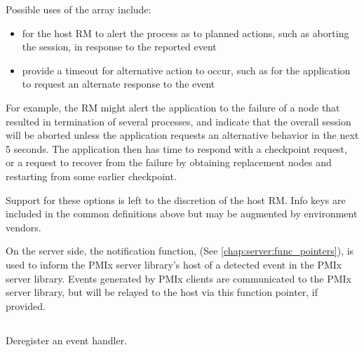 \adviceuserstart
Possible uses of the  array include:

\begin{itemize}
%
\item for the host \ac{RM} to alert the process as to planned actions, such as aborting the session, in response to the reported event
%
\item provide a timeout for alternative action to occur, such as for the application to request an alternate response to the event
%
\end{itemize}

For example, the \ac{RM} might alert the application to the failure of a node that resulted in termination of several processes, and indicate that the overall session will be aborted unless the application requests an alternative behavior in the next 5 seconds. The application then has time to respond with a checkpoint request, or a request to recover from the failure by obtaining replacement nodes and restarting from some earlier checkpoint.

Support for these options is left to the discretion of the host \ac{RM}. Info keys are included in the common definitions above but may be augmented by environment vendors.
\adviceuserend

\advicermstart
On the server side, the notification function,  (See \ref{chap:server:func_pointers}), is used to inform the \ac{PMIx} server library's host of a detected event in the \ac{PMIx} server library. Events generated by \ac{PMIx} clients are communicated to the \ac{PMIx} server library, but will be relayed to the host via this  function pointer, if provided.
\advicermend


\subsection{}

\summary

Deregister an event handler.

\format


